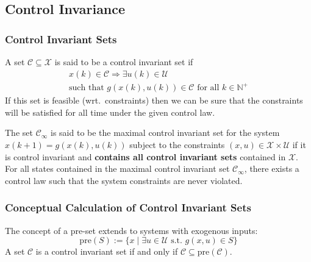 \subsection{Control Invariance}
\subsubsection{Control Invariant Sets}
A set $\mathcal{C} \subseteq \mathcal{X}$ is said to be a control invariant set if
\begin{gather*}
    x(k) \in \mathcal{C} \Rightarrow \exists u(k) \in \mathcal{U}\\
    \text{such that } g(x(k), u(k)) \in \mathcal{C} \text{ for all } k \in \mathbb{N}^+
\end{gather*}
If this set is feasible (wrt.\ constraints) then we can be sure that the constraints will be satisfied for all time under the given control law.

\newpar{}

The set $\mathcal{C}_\infty$ is said to be the maximal control invariant set for the system $x(k + 1) = g(x(k), u(k))$ subject to the constraints $(x, u) \in \mathcal{X} \times \mathcal{U}$ if it is control invariant and \textbf{contains all control invariant sets} contained in $\mathcal{X}$.
\newpar{}
For all states contained in the maximal control invariant set $\mathcal{C}_\infty$, there exists a control law such that the system constraints are never violated.

\subsubsection{Conceptual Calculation of Control Invariant Sets}

The concept of a pre-set extends to systems with exogenous inputs:
\begin{equation*}
    \text{pre}(S) := \{x \mid \exists u \in \mathcal{U} \text{ s.t. } g(x, u) \in S \}
\end{equation*}
A set $\mathcal{C}$ is a control invariant set if and only if $\mathcal{C} \subseteq \text{pre}(\mathcal{C})$.

\newpar{}

